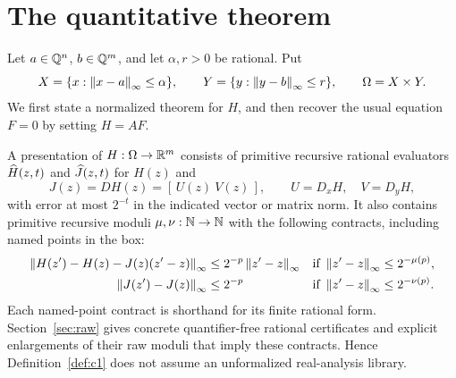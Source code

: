 \section{The quantitative theorem}\label{sec:theorem}

Let \(a\in\mathbb Q^n\), \(b\in\mathbb Q^m\), and let \(\alpha,r>0\) be rational.
Put
\[
 X=\{x:\left\lVert x-a\right\rVert_\infty\le\alpha\},\qquad
 Y=\{y:\left\lVert y-b\right\rVert_\infty\le r\},\qquad \Omega=X\times Y.
\]
We first state a normalized theorem for \(H\), and then recover the
usual equation \(F=0\) by setting \(H=AF\).

\begin{definition}\label{def:c1}
A presentation of \(H:\Omega\to\mathbb R^m\) consists of primitive recursive
rational evaluators \(\widehat H(z,t)\) and
\(\widehat J(z,t)\) for \(H(z)\) and
\[
 J(z)=D H(z)=[\,U(z)\ V(z)\,],
 \qquad U=D_xH,\quad V=D_yH,
\]
with error at most \(2^{-t}\) in the indicated vector or matrix norm.
It also contains primitive recursive moduli \(\mu,\nu:\mathbb N\to\mathbb N\)
with the following contracts, including named points in the box:
\begin{align}
 \left\lVert H(z')-H(z)-J(z)(z'-z)\right\rVert_\infty
  &\le 2^{-p}\left\lVert z'-z\right\rVert_\infty
 &&\text{if }\left\lVert z'-z\right\rVert_\infty\le2^{-\mu(p)},\label{eq:taylor}\\
 \left\lVert J(z')-J(z)\right\rVert_\infty
  &\le 2^{-p}
 &&\text{if }\left\lVert z'-z\right\rVert_\infty\le2^{-\nu(p)}.\label{eq:duc}
\end{align}
Each named-point contract is shorthand for its finite rational
form. Section~\ref{sec:raw} gives concrete quantifier-free rational
certificates and explicit enlargements of their raw moduli that
imply these contracts. Hence Definition~\ref{def:c1} does not assume
an unformalized real-analysis library.
\end{definition}

